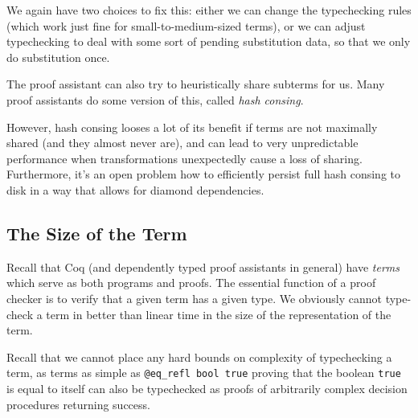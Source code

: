 
We again have two choices to fix this:
either we can change the typechecking rules (which work just fine for small-to-medium-sized terms), or we can adjust typechecking to deal with some sort of pending substitution data, so that we only do substitution once.




The proof assistant can also try to heuristically share subterms for us.
Many proof assistants do some version of this, called \emph{hash consing}.

However, hash consing looses a lot of its benefit if terms are not maximally shared (and they almost never are), and can lead to very unpredictable performance when transformations unexpectedly cause a loss of sharing.
Furthermore, it's an open problem how to efficiently persist full hash consing to disk in a way that allows for diamond dependencies.

\subsection{The Size of the Term}

Recall that Coq (and dependently typed proof assistants in general) have \emph{terms} which serve as both programs and proofs.
The essential function of a proof checker is to verify that a given term has a given type.
We obviously cannot type-check a term in better than linear time in the size of the representation of the term.

Recall that we cannot place any hard bounds on complexity of typechecking a term, as terms as simple as \texttt{@eq_refl bool true} proving that the boolean \texttt{true} is equal to itself can also be typechecked as proofs of arbitrarily complex decision procedures returning success.

